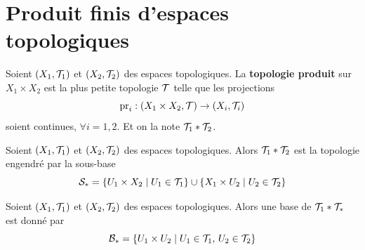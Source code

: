 \section{Produit finis d'espaces topologiques}

\begin{definition}
	Soient $(X_1, \mathcal T_1)$ et $(X_2, \mathcal T_2)$ des espaces topologiques. La \textbf{topologie produit} sur $X_1 \times X_2$ est la plus petite topologie $\mathcal T$ telle que les projections
	\[
	\operatorname{pr}_i : (X_1 \times X_2, \mathcal T) \to (X_i, \mathcal T_i)
	\]
	soient continues, $\forall i = 1,2$. Et on la note $\mathcal T_1 * \mathcal T_2$.
\end{definition}


\begin{lemme} \label{lem: Sous base du l'espace produit}
	Soient $(X_1, \mathcal T_1)$ et $(X_2, \mathcal T_2)$ des espaces topologiques. Alors $\mathcal T_1 * \mathcal T_2$ est la topologie engendré par la sous-base
	\[
	\mathcal S_* = \{ U_1 \times X_2 \mid U_1 \in \mathcal T_1\} \cup \{X_1 \times U_2 \mid U_2 \in \mathcal T_2\}
	\]
\end{lemme}


\begin{proposition}
	Soient $(X_1, \mathcal T_1)$ et $(X_2, \mathcal T_2)$ des espaces topologiques. Alors une base de $\mathcal T_1 * \mathcal T_*$ est donné par
	\[
	\mathcal B_* = \{U_1 \times U_2 \mid U_1 \in \mathcal T_1, \, U_2 \in \mathcal T_2\}
	\]
\end{proposition}

